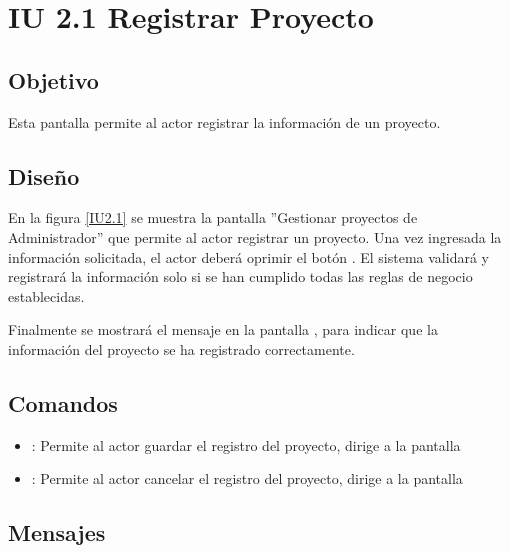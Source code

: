 \section{IU 2.1 Registrar Proyecto}

\subsection{Objetivo}
	Esta pantalla permite al actor registrar la información de un proyecto.
\subsection{Diseño}
	En la figura \ref{IU2.1} se muestra la pantalla ''Gestionar proyectos de Administrador'' que permite al actor registrar un proyecto.
	Una vez ingresada la información solicitada, el actor deberá oprimir el botón  . El sistema validará y registrará la información solo si se han cumplido todas las reglas de negocio establecidas.
	
	Finalmente se mostrará el mensaje  en la pantalla , para indicar que la información del proyecto se ha registrado correctamente.

 \label{IU2.1}
\subsection{Comandos}
\begin{itemize}
	\item {}: Permite al actor guardar el registro del proyecto, dirige a la pantalla 
	\item {}: Permite al actor cancelar el registro del proyecto, dirige a la pantalla 
\end{itemize}

\subsection{Mensajes}

